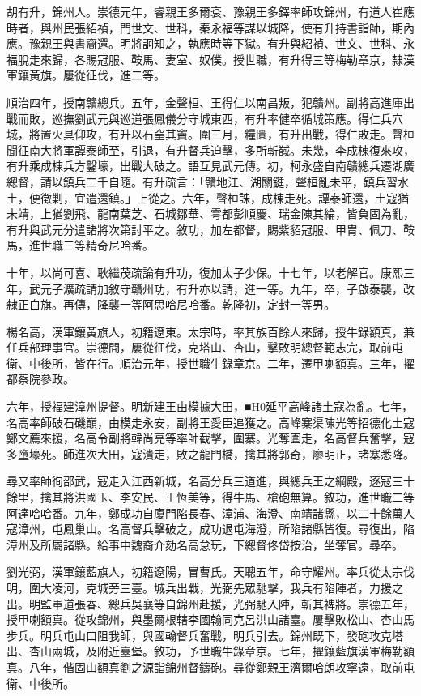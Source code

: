 \begin{pinyinscope}
胡有升，錦州人。崇德元年，睿親王多爾袞、豫親王多鐸率師攻錦州，有道人崔應時者，與州民張紹禎，門世文、世科，秦永福等謀以城降，使有升持書詣師，期內應。豫親王與書齎還。明將詗知之，執應時等下獄。有升與紹禎、世文、世科、永福脫走來歸，各賜冠服、鞍馬、妻室、奴僕。授世職，有升得三等梅勒章京，隸漢軍鑲黃旗。屢從征伐，進二等。

順治四年，授南贛總兵。五年，金聲桓、王得仁以南昌叛，犯贛州。副將高進庫出戰而敗，巡撫劉武元與巡道張鳳儀分守城東西，有升率健卒循城策應。得仁兵穴城，將置火具仰攻，有升以石窒其竇。圍三月，糧匱，有升出戰，得仁敗走。聲桓聞征南大將軍譚泰師至，引退，有升督兵迫擊，多所斬馘。未幾，李成棟復來攻，有升乘成棟兵方鑿壕，出戰大破之。語互見武元傳。初，柯永盛自南贛總兵遷湖廣總督，請以鎮兵二千自隨。有升疏言：「贛地江、湖關鍵，聲桓亂未平，鎮兵習水土，便徵剿，宜遣還鎮。」上從之。六年，聲桓誅，成棟走死。譚泰師還，土寇猶未靖，上猶劉飛、龍南葉芝、石城鄒華、雩都彭順慶、瑞金陳其綸，皆負固為亂，有升與武元分遣諸將次第討平之。敘功，加左都督，賜紫貂冠服、甲胄、佩刀、鞍馬，進世職三等精奇尼哈番。

十年，以尚可喜、耿繼茂疏論有升功，復加太子少保。十七年，以老解官。康熙三年，武元子瀇疏請加敘守贛州功，有升亦以請，進一等。九年，卒，子啟泰襲，改隸正白旗。再傳，降襲一等阿思哈尼哈番。乾隆初，定封一等男。

楊名高，漢軍鑲黃旗人，初籍遼東。太宗時，率其族百餘人來歸，授牛錄額真，兼任兵部理事官。崇德間，屢從征伐，克塔山、杏山，擊敗明總督範志完，取前屯衛、中後所，皆在行。順治元年，授世職牛錄章京。二年，遷甲喇額真。三年，擢都察院參政。

六年，授福建漳州提督。明新建王由模據大田，■H0延平高峰諸土寇為亂。七年，名高率師破石磯巔，由模走永安，副將王愛臣追獲之。高峰寨渠陳光等招德化土寇鄭文薦來援，名高令副將韓尚亮等率師截擊，圍寨。光奪圍走，名高督兵奮擊，寇多墮壕死。師進次大田，寇潰走，敗之龍門橋，擒其將郭奇，廖明正，諸寨悉降。

尋又率師徇邵武，寇走入江西新城，名高分兵三道進，與總兵王之綱殿，逐寇三十餘里，擒其將洪國玉、李安民、王恆美等，得牛馬、槍砲無算。敘功，進世職二等阿達哈哈番。九年，鄭成功自廈門陷長春、漳浦、海澄、南靖諸縣，以二十餘萬人寇漳州，屯鳳巢山。名高督兵擊破之，成功退屯海澄，所陷諸縣皆復。尋復出，陷漳州及所屬諸縣。給事中魏裔介劾名高怠玩，下總督佟岱按治，坐奪官。尋卒。

劉光弼，漢軍鑲藍旗人，初籍遼陽，冒曹氏。天聰五年，命守耀州。率兵從太宗伐明，圍大凌河，克城旁三臺。城兵出戰，光弼先眾馳擊，我兵有陷陣者，力援之出。明監軍道張春、總兵吳襄等自錦州赴援，光弼馳入陣，斬其裨將。崇德五年，授甲喇額真。從攻錦州，與墨爾根轄李國翰同克呂洪山諸臺。屢擊敗松山、杏山馬步兵。明兵屯山口阻我師，與國翰督兵奮戰，明兵引去。錦州既下，發砲攻克塔出、杏山兩城，及附近臺堡。敘功，予世職牛錄章京。七年，擢鑲藍旗漢軍梅勒額真。八年，偕固山額真劉之源詣錦州督鑄砲。尋從鄭親王濟爾哈朗攻寧遠，取前屯衛、中後所。


\end{pinyinscope}
